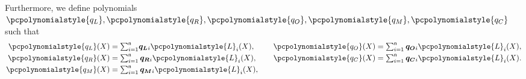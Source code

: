 \documentclass[10pt]{llncs}
\newcommand{\pcvarstyle}[1]{\mathsf{#1}}
\newcommand{\p}[1]{\pcpolynomialstyle{#1}}
\newcommand{\numberofconstrains}{\pcvarstyle{n}}
\newcommand{\noofc}{\numberofconstrains}
\newcommand{\lag}{\p{L}}
\begin{document}
Furthermore, we define polynomials $\p{q_L}, \p{q_R}, \p{q_O}, \p{q_M}, \p{q_C}$
such that
\begin{equation*}
\begin{aligned}
\p{q_L}(X) & = {\textstyle \sum_{i = 1}^{\noofc}} \vql_i \lag_i(X), \\
\p{q_R}(X) & = \textstyle \sum_{i = 1}^{\noofc} \vqr_i \lag_i(X), \\
\p{q_M}(X) & = \textstyle \sum_{i = 1}^{\noofc} \vqm_i \lag_i(X),
\end{aligned}
\qquad
\begin{aligned}
\p{q_O}(X) & = \textstyle  \sum_{i = 1}^{\noofc} \vqo_i \lag_i(X), \\
\p{q_C}(X) & =  \textstyle \sum_{i = 1}^{\noofc} \vqc_i \lag_i(X). \\
\vphantom{\p{q_M}(X)  = \textstyle \sum_{i = 1}^{\noofc} \vqm_i \lag_i(X),}
\end{aligned}
\end{equation*}
\end{document}
